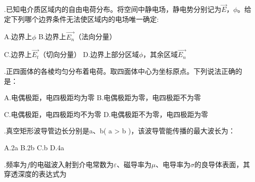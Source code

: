 .\hspace{0.8em}已知电介质区域内的自由电荷分布。将空间中静电场，静电势分别记为$\Vec{E}$，$ \phi$。给定下列哪个边界条件无法使区域内的电场唯一确定:\vspace{0.2cm}

A.\hspace{0.8em}边界上$ \phi$\hspace{11.2em}
B.\hspace{0.8em}边界上$\Vec{E_n}$（法向分量）\vspace{0.2cm}

C.\hspace{0.8em}边界上$\Vec{E_t}$（切向分量）\hspace{5em}
D.\hspace{0.8em}边界上部分区域$ \phi$，其余区域$\Vec{E_n}$\vspace{0.2cm}

.\hspace{0.8em}正四面体的各棱均匀分布着电荷。取四面体中心为坐标原点。下列说法正确的是：\vspace{0.2cm}

A.\hspace{0.8em}电偶极距，电四极距均为零\hspace{6em}
B.\hspace{0.8em}电偶极距为零，电四极距不为零\vspace{0.2cm}

C.\hspace{0.8em}电偶极距，电四极距均不为零\hspace{5em}
D.\hspace{0.8em}电偶极距不为零，电四极距为零\vspace{0.2cm}

.\hspace{0.8em}真空矩形波导管边长分别是a、b( a > b )，该波导管能传播的最大波长为：\vspace{0.2cm}

A.\hspace{0.8em}2a\hspace{5em} B.\hspace{0.8em}2b\hspace{5em}  C.\hspace{0.8em}b\hspace{5em} D.\hspace{0.8em}4a\vspace{0.2cm}

.\hspace{0.8em}频率为$f$的电磁波入射到介电常数为$\varepsilon$、磁导率为$\mu$、电导率为$\sigma$的良导体表面，其穿透深度的表达式为\vspace{0.3cm}

